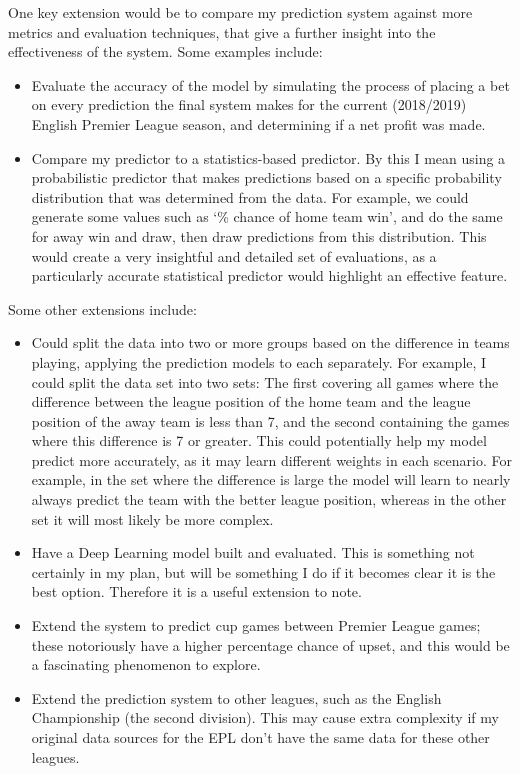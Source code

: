 \documentclass[12pt,a4paper,twoside]{article}
\begin{document}
One key extension would be to compare my prediction system against more metrics and evaluation techniques, that give a further insight into the effectiveness of the system. Some examples include:

\begin{itemize}
    \item
    {
    Evaluate the accuracy of the model by simulating the process of placing a bet on every prediction the final system makes for the current (2018/2019) English Premier League season, and determining if a net profit was made.
    }
    \item 
    {
    Compare my predictor to a statistics-based predictor. By this I mean using a probabilistic predictor that makes predictions based on a specific probability distribution that was determined from the data. For example, we could generate some values such as `\% chance of home team win', and do the same for away win and draw, then draw predictions from this distribution. This would create a very insightful and detailed set of evaluations, as a particularly accurate statistical predictor would highlight an effective feature.
    }
\end{itemize}

Some other extensions include:

\begin{itemize}
    \item
    {
    Could split the data into two or more groups based on the difference in teams playing, applying the prediction models to each separately. For example, I could split the data set into two sets: The first covering all games where the difference between the league position of the home team and the league position of the away team is less than 7, and the second containing the games where this difference is 7 or greater. This could potentially help my model predict more accurately, as it may learn different weights in each scenario. For example, in the set where the difference is large the model will learn to nearly always predict the team with the better league position, whereas in the other set it will most likely be more complex.
    }
    \item
    {
    Have a Deep Learning model built and evaluated. This is something not certainly in my plan, but will be something I do if it becomes clear it is the best option. Therefore it is a useful extension to note.
    }
    \item
    {
    Extend the system to predict cup games between Premier League games; these notoriously have a higher percentage chance of upset, and this would be a fascinating phenomenon to explore.
    }
    \item
    {
    Extend the prediction system to other leagues, such as the English Championship (the second division). This may cause extra complexity if my original data sources for the EPL don't have the same data for these other leagues.
    }
\end{itemize}
\end{document}
